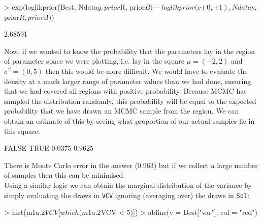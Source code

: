 \documentclass{article}
\begin{document}
\begin{Schunk}
\begin{Sinput}
> exp(loglikprior(Best, Ndata$y, prior$R, prior$B) - loglikprior(c(0, 
+     1), Ndata$y, prior$R, prior$B))
\end{Sinput}
\begin{Soutput}
[1] 2.68591
\end{Soutput}
\end{Schunk}


Now, if we wanted to know the probability that the parameters lay in the region of parameter space we were plotting, i.e. lay in the square $\mu = (-2,2)$ and $\sigma^{2} = (0,5)$ then this would be more difficult. We would have to evaluate the density at a much larger range of parameter values than we had done, ensuring that we had covered all regions with positive probability. Because MCMC has sampled the distribution randomly, this probability will be equal to the expected probability that we have drawn an MCMC sample from the region. We can obtain an estimate of this by seeing what proportion of our actual samples lie in this square:

\begin{Schunk}
\begin{Soutput}
 FALSE   TRUE 
0.0375 0.9625 
\end{Soutput}
\end{Schunk}

There is Monte Carlo error in the answer (0.963) but if we collect a large number of samples then this can be minimised.\\ 

Using a similar logic we can obtain the marginal distribution of the variance by simply evaluating the draws in \texttt{VCV} ignoring (averaging over) the draws in \texttt{Sol}:

\iftalk
\else
\begin{Schunk}
\begin{Sinput}
> hist(m1a.2$VCV[which(m1a.2$VCV < 5)])
> abline(v = Best["var"], col = "red")
\end{Sinput}
\end{Schunk}
\fi
\end{document}
